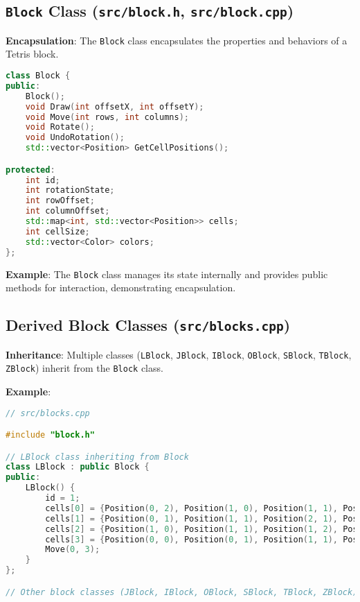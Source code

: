\documentclass{article}
\begin{document}
\subsection{\texttt{Block} Class (\texttt{src/block.h}, \texttt{src/block.cpp})}

\textbf{Encapsulation}: The \texttt{Block} class encapsulates the properties and behaviors of a Tetris block.

\begin{lstlisting}[language=C++]
class Block {
public:
    Block();
    void Draw(int offsetX, int offsetY);
    void Move(int rows, int columns);
    void Rotate();
    void UndoRotation();
    std::vector<Position> GetCellPositions();

protected:
    int id;
    int rotationState;
    int rowOffset;
    int columnOffset;
    std::map<int, std::vector<Position>> cells;
    int cellSize;
    std::vector<Color> colors;
};
\end{lstlisting}

\textbf{Example}: The \texttt{Block} class manages its state internally and provides public methods for interaction, demonstrating encapsulation.

\subsection{Derived Block Classes (\texttt{src/blocks.cpp})}

\textbf{Inheritance}: Multiple classes (\texttt{LBlock}, \texttt{JBlock}, \texttt{IBlock}, \texttt{OBlock}, \texttt{SBlock}, \texttt{TBlock}, \texttt{ZBlock}) inherit from the \texttt{Block} class.

\textbf{Example}:

\begin{lstlisting}[language=C++]
// src/blocks.cpp

#include "block.h"

// LBlock class inheriting from Block
class LBlock : public Block {
public:
    LBlock() {
        id = 1;
        cells[0] = {Position(0, 2), Position(1, 0), Position(1, 1), Position(1, 2)};
        cells[1] = {Position(0, 1), Position(1, 1), Position(2, 1), Position(2, 2)};
        cells[2] = {Position(1, 0), Position(1, 1), Position(1, 2), Position(2, 0)};
        cells[3] = {Position(0, 0), Position(0, 1), Position(1, 1), Position(2, 1)};
        Move(0, 3);
    }
};

// Other block classes (JBlock, IBlock, OBlock, SBlock, TBlock, ZBlock) defined similarly
\end{lstlisting}
\end{document}
